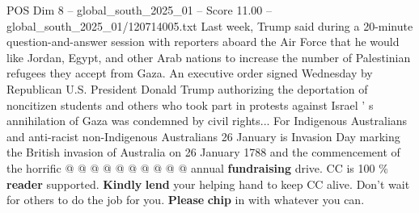 \begin{textsample}{POS Dim 8 – global\_south\_2025\_01 – Score 11.00 – global\_south\_2025\_01/120714005.txt}
Last week, Trump said during a 20-minute question-and-answer session with reporters aboard the Air Force that he would like Jordan, Egypt, and other Arab nations to increase the number of Palestinian refugees they accept from Gaza.
An executive order signed Wednesday by Republican U.S.
President Donald Trump authorizing the deportation of noncitizen students and others who took part in protests against Israel ' s annihilation of Gaza was condemned by civil rights...
For Indigenous Australians and anti-racist non-Indigenous Australians 26 January is Invasion Day marking the British invasion of Australia on 26 January 1788 and the commencement of the horrific @ @ @ @ @ @ @ @ @ @ annual \textbf{fundraising} drive.
CC is 100 \% \textbf{reader} supported. \textbf{Kindly} \textbf{lend} your helping hand to keep CC alive.
Don't wait for others to do the job for you. \textbf{Please} \textbf{chip} in with whatever you can.

\end{textsample}
